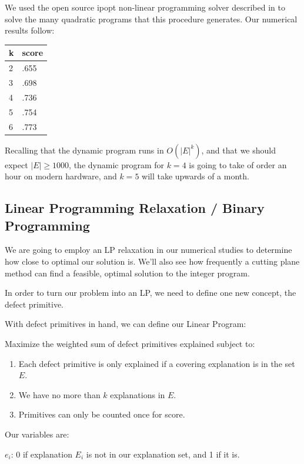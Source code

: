 \documentclass[11pt,twocolumn]{article}
\begin{document}
We used the open source ipopt non-linear programming solver described in \cite{wachter2006implementation} to solve the many quadratic programs that this procedure generates.  Our numerical results follow:

\begin{tabular}{l|l}
k & score \\ \hline
2 & .655 \\ 
3 & .698 \\
4 & .736 \\
5 & .754 \\
6 & .773 \\
\end{tabular}

Recalling that the dynamic program runs in $O(|E|^{k})$, and that we should expect $|E| \geq 1000$, the dynamic program for $k=4$ is going to take of order an hour on modern hardware, and $k=5$ will take upwards of a month.

\subsection{Linear Programming Relaxation / Binary Programming} \label{sec:IP}

We are going to employ an LP relaxation in our numerical studies to determine how close to optimal our solution is.  We'll also see how frequently a cutting plane method can find a feasible, optimal solution to the integer program.

In order to turn our problem into an LP, we need to define one new concept, the defect primitive. 

With defect primitives in hand, we can define our Linear Program:

Maximize the weighted sum of defect primitives explained subject to:

\begin{enumerate}
\item Each defect primitive is only explained if a covering explanation is in the set {\bf $E$}.

\item We have no more than $k$ explanations in {\bf $E$}.

\item Primitives can only be counted once for score.
\end{enumerate}

Our variables are: 

$e_i$: 0 if explanation $E_i$ is not in our explanation set, and 1 if it is.
\end{document}

